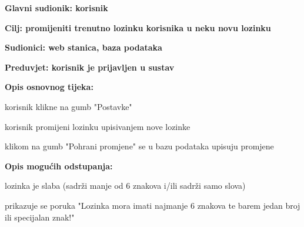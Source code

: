 				
					\noindent {}
					\begin{packed_item}
						\item \textbf{Glavni sudionik: korisnik}
						\item  \textbf{Cilj: promijeniti trenutno lozinku korisnika u neku novu lozinku}
						\item  \textbf{Sudionici: web stanica, baza podataka}
						\item  \textbf{Preduvjet: korisnik je prijavljen u sustav}
						
						\item  \textbf{Opis osnovnog tijeka:}
						\item[] \begin{packed_enum}
							\item korisnik klikne na gumb "Postavke"
							\item korisnik promijeni lozinku upisivanjem nove lozinke
							\item klikom na gumb "Pohrani promjene" se u bazu podataka upisuju promjene
						\end{packed_enum}
						
						\item  \textbf{Opis mogućih odstupanja:}
						\item[] \begin{packed_item}
							\item[2.a] lozinka je slaba (sadrži manje od 6 znakova i/ili sadrži samo slova)
							\begin{packed_item}
								\item prikazuje se poruka "Lozinka mora imati najmanje 6 znakova te barem jedan broj ili specijalan znak!"
							\end{packed_item}
						\end{packed_item}
					\end{packed_item}
				
				
				
